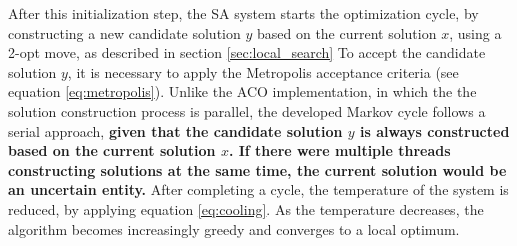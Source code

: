 
After this initialization step, the SA system starts the optimization cycle, by constructing a new candidate solution $y$ based on the current solution $x$, using a
2-opt move, as described in section \ref{sec:local_search}
To accept the candidate solution $y$, it is necessary to apply the Metropolis acceptance criteria (see equation \ref{eq:metropolis}).
Unlike the ACO implementation, in which the the solution construction process is parallel, the developed Markov cycle follows a serial approach, 
\textbf{given that the candidate solution $y$ is always constructed based on the current solution $x$. If there were multiple threads constructing solutions at the same time, the current solution would be an uncertain entity.} 
After completing a cycle, the temperature of the system is reduced, by applying equation \ref{eq:cooling}. As the temperature decreases, the algorithm becomes increasingly greedy and converges to a local optimum.



